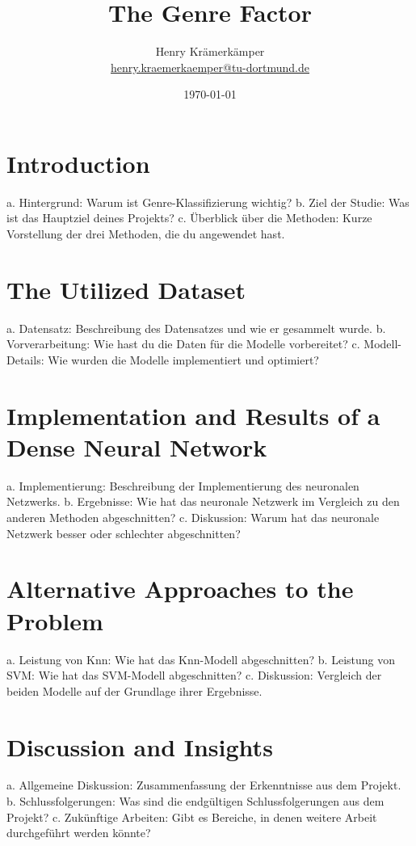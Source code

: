 \documentclass[
  12pt,
  bibliography=totoc,     %
  captions=tableheading,  %
  titlepage=firstiscover, %
]{scrartcl}
\author{%
  Henry Krämerkämper\\%
  \href{mailto:henry.kraemerkaemper@tu-dortmund.de}{henry.kraemerkaemper@tu-dortmund.de}%
}
\title{The Genre Factor}
\date{\today}
\begin{document}
\maketitle
\thispagestyle{empty}
\tableofcontents
\newpage
{}

\section{Introduction}
a. Hintergrund: Warum ist Genre-Klassifizierung wichtig?
b. Ziel der Studie: Was ist das Hauptziel deines Projekts?
c. Überblick über die Methoden: Kurze Vorstellung der drei Methoden, die du angewendet hast.

\section{The Utilized Dataset}
a. Datensatz: Beschreibung des Datensatzes und wie er gesammelt wurde.
b. Vorverarbeitung: Wie hast du die Daten für die Modelle vorbereitet?
c. Modell-Details: Wie wurden die Modelle implementiert und optimiert?

\section{Implementation and Results of a Dense Neural Network}
a. Implementierung: Beschreibung der Implementierung des neuronalen Netzwerks.
b. Ergebnisse: Wie hat das neuronale Netzwerk im Vergleich zu den anderen Methoden abgeschnitten?
c. Diskussion: Warum hat das neuronale Netzwerk besser oder schlechter abgeschnitten?

\section{Alternative Approaches to the Problem}
a. Leistung von Knn: Wie hat das Knn-Modell abgeschnitten?
b. Leistung von SVM: Wie hat das SVM-Modell abgeschnitten?
c. Diskussion: Vergleich der beiden Modelle auf der Grundlage ihrer Ergebnisse.

\section{Discussion and Insights}
a. Allgemeine Diskussion: Zusammenfassung der Erkenntnisse aus dem Projekt.
b. Schlussfolgerungen: Was sind die endgültigen Schlussfolgerungen aus dem Projekt?
c. Zukünftige Arbeiten: Gibt es Bereiche, in denen weitere Arbeit durchgeführt werden könnte?

\printbibliography
\end{document}
